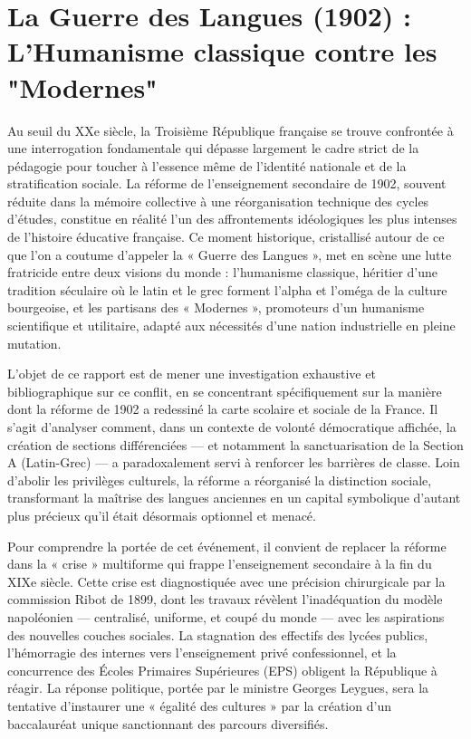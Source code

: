 

\section{La Guerre des Langues (1902) : L'Humanisme classique contre les "Modernes"}

Au seuil du XXe siècle, la Troisième République française se trouve confrontée à une interrogation
fondamentale qui dépasse largement le cadre strict de la pédagogie pour toucher à l'essence même de
l'identité nationale et de la stratification sociale. La réforme de l'enseignement secondaire de
1902, souvent réduite dans la mémoire collective à une réorganisation technique des cycles d'études,
constitue en réalité l'un des affrontements idéologiques les plus intenses de l'histoire éducative
française. Ce moment historique, cristallisé autour de ce que l'on a coutume d'appeler la « Guerre
des Langues », met en scène une lutte fratricide entre deux visions du monde : l'humanisme
classique, héritier d'une tradition séculaire où le latin et le grec forment l'alpha et l'oméga de
la culture bourgeoise, et les partisans des « Modernes », promoteurs d'un humanisme scientifique et
utilitaire, adapté aux nécessités d'une nation industrielle en pleine mutation.

L'objet de ce rapport est de mener une investigation exhaustive et bibliographique sur ce conflit,
en se concentrant spécifiquement sur la manière dont la réforme de 1902 a redessiné la carte
scolaire et sociale de la France. Il s'agit d'analyser comment, dans un contexte de volonté
démocratique affichée, la création de sections différenciées — et notamment la sanctuarisation de la
Section A (Latin-Grec) — a paradoxalement servi à renforcer les barrières de classe. Loin d'abolir
les privilèges culturels, la réforme a réorganisé la distinction sociale, transformant la maîtrise
des langues anciennes en un capital symbolique d'autant plus précieux qu'il était désormais
optionnel et menacé.

Pour comprendre la portée de cet événement, il convient de replacer la réforme dans la « crise »
multiforme qui frappe l'enseignement secondaire à la fin du XIXe siècle. Cette crise est
diagnostiquée avec une précision chirurgicale par la commission Ribot de 1899, dont les travaux
révèlent l'inadéquation du modèle napoléonien — centralisé, uniforme, et coupé du monde — avec les
aspirations des nouvelles couches sociales.\cite{I-2-1-ref1} La stagnation des effectifs des lycées
publics, l'hémorragie des internes vers l'enseignement privé confessionnel, et la concurrence des
Écoles Primaires Supérieures (EPS) obligent la République à réagir.\cite{I-2-1-ref1} La réponse
politique, portée par le ministre Georges Leygues, sera la tentative d'instaurer une « égalité des
cultures » par la création d'un baccalauréat unique sanctionnant des parcours diversifiés.


